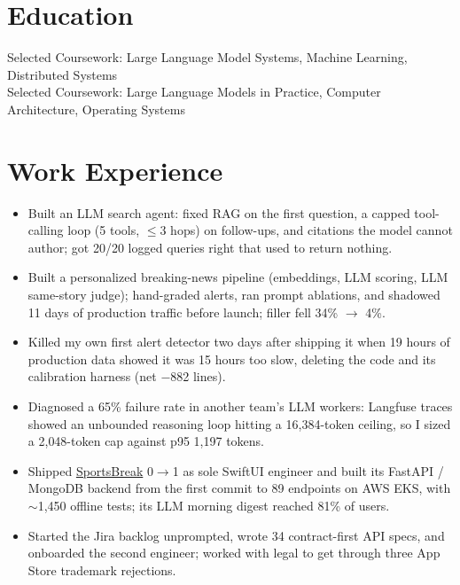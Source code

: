 \documentclass[11pt, letterpaper]{article}
\begin{document}

\section{Education}
Selected Coursework: Large Language Model Systems, Machine Learning, Distributed Systems\\[1pt]
Selected Coursework: Large Language Models in Practice, Computer Architecture, Operating Systems

\section{Work Experience}
\begin{itemize}
  \item Built an LLM search agent: fixed RAG on the first question, a capped tool-calling loop (5 tools, $\le$3 hops) on follow-ups, and citations the model cannot author; got 20/20 logged queries right that used to return nothing.
  \item Built a personalized breaking-news pipeline (embeddings, LLM scoring, LLM same-story judge); hand-graded alerts, ran prompt ablations, and shadowed 11 days of production traffic before launch; filler fell 34\% $\to$ 4\%.
  \item Killed my own first alert detector two days after shipping it when 19 hours of production data showed it was 15 hours too slow, deleting the code and its calibration harness (net $-$882 lines).
  \item Diagnosed a 65\% failure rate in another team's LLM workers: Langfuse traces showed an unbounded reasoning loop hitting a 16{,}384-token ceiling, so I sized a 2{,}048-token cap against p95 1{,}197 tokens.
  \item Shipped \href{https://apps.apple.com/app/id6762649287}{SportsBreak} 0$\to$1 as sole SwiftUI engineer and built its FastAPI / MongoDB backend from the first commit to 89 endpoints on AWS EKS, with $\sim$1{,}450 offline tests; its LLM morning digest reached 81\% of users.
  \item Started the Jira backlog unprompted, wrote 34 contract-first API specs, and onboarded the second engineer; worked with legal to get through three App Store trademark rejections.
\end{itemize}
\end{document}
